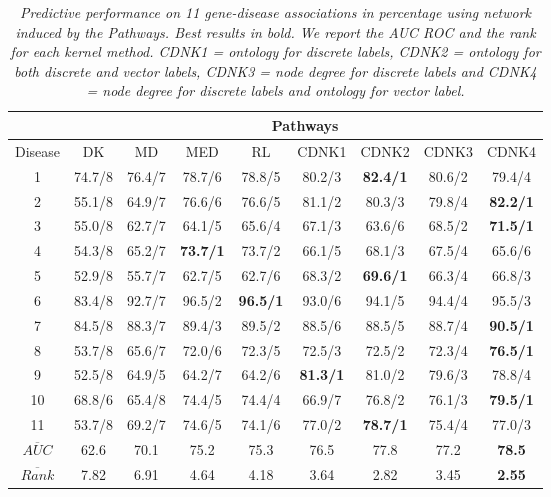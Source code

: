 \begin{table}
\caption{\textit {Predictive performance on 11 gene-disease associations in percentage using network induced by the Pathways. Best results in bold. We report the AUC ROC and the rank for each kernel method.  CDNK1 = ontology for discrete labels, CDNK2 = ontology for both discrete and vector labels, CDNK3 = node degree for discrete labels and CDNK4 = node degree for discrete labels and ontology for vector label.}}
\vspace*{5pt}
\centering
\setlength{\tabcolsep}{1mm}
\begin{tabular}{|c|c|c|c|c|c|c|c|c|}
\hline
         & \multicolumn{8}{c|}{\textbf{Pathways}} \\
 \hline
Disease & DK & MD & MED & RL & CDNK1 & CDNK2 & CDNK3 & CDNK4 \\

 \hline
1 & 74.7/8 & 76.4/7 & 78.7/6 & 78.8/5 & 80.2/3 & \textbf{82.4/1} & 80.6/2 & 79.4/4 \\
2 & 55.1/8 & 64.9/7 & 76.6/6 & 76.6/5 & 81.1/2 & 80.3/3 & 79.8/4 & \textbf{82.2/1} \\
3 & 55.0/8 & 62.7/7 & 64.1/5 & 65.6/4 & 67.1/3 & 63.6/6 & 68.5/2 & \textbf{71.5/1} \\
4 & 54.3/8 & 65.2/7 & \textbf{73.7/1} & 73.7/2 & 66.1/5 & 68.1/3 & 67.5/4 & 65.6/6 \\
5 & 52.9/8 & 55.7/7 & 62.7/5 & 62.7/6 & 68.3/2 & \textbf{69.6/1} & 66.3/4 & 66.8/3 \\
6 & 83.4/8 & 92.7/7 & 96.5/2 & \textbf{96.5/1} & 93.0/6 & 94.1/5 & 94.4/4 & 95.5/3 \\
7 & 84.5/8 & 88.3/7 & 89.4/3 & 89.5/2 & 88.5/6 & 88.5/5 & 88.7/4 & \textbf{90.5/1} \\
8 & 53.7/8 & 65.6/7 & 72.0/6 & 72.3/5 & 72.5/3 & 72.5/2 & 72.3/4 & \textbf{76.5/1} \\
9 & 52.5/8 & 64.9/5 & 64.2/7 & 64.2/6 & \textbf{81.3/1} & 81.0/2 & 79.6/3 & 78.8/4 \\
10 & 68.8/6 & 65.4/8 & 74.4/5 & 74.4/4 & 66.9/7 & 76.8/2 & 76.1/3 & \textbf{79.5/1} \\
11 & 53.7/8 & 69.2/7 & 74.6/5 & 74.1/6 & 77.0/2 & \textbf{78.7/1} & 75.4/4 & 77.0/3 \\
\hline
$\overline{AUC}$ & 62.6 & 70.1 & 75.2 & 75.3 & 76.5 & 77.8 & 77.2 & \textbf{78.5} \\
$\overline{Rank}$ & 7.82 & 6.91 & 4.64 & 4.18 & 3.64 & 2.82 & 3.45 & \textbf{2.55} \\
 \hline 
\end{tabular}
\label{table_pathways}
\end{table}

